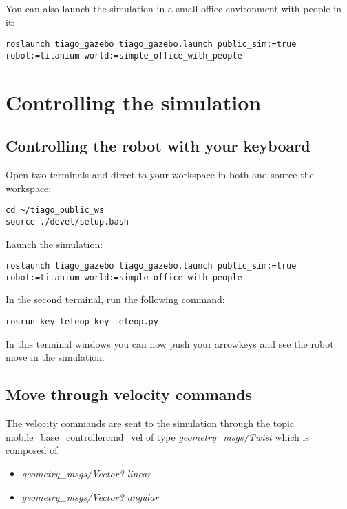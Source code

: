 You can also launch the simulation in a small office environment with people in it:

\begin{verbatim}
roslaunch tiago_gazebo tiago_gazebo.launch public_sim:=true robot:=titanium world:=simple_office_with_people
\end{verbatim}

\section{Controlling the simulation}

\subsection{Controlling the robot with your keyboard}

Open two terminals and direct to your workspace in both and source the workspace:

\begin{verbatim}
cd ~/tiago_public_ws
source ./devel/setup.bash
\end{verbatim}

Launch the simulation:

\begin{verbatim}
roslaunch tiago_gazebo tiago_gazebo.launch public_sim:=true robot:=titanium world:=simple_office_with_people
\end{verbatim}

In the second terminal, run the following command:

\begin{verbatim}
rosrun key_teleop key_teleop.py
\end{verbatim}

In this terminal windows you can now push your arrowkeys and see the robot move in the simulation.

\subsection{Move through velocity commands}

The velocity commands are sent to the simulation through the topic mobile\_base\_controllercmd\_vel of type \textit{geometry\_msgs/Twist} which is composed of:

\begin{itemize}
\item \textit{geometry\_msgs/Vector3 linear}
\item \textit{geometry\_msgs/Vector3 angular}
\end{itemize}

